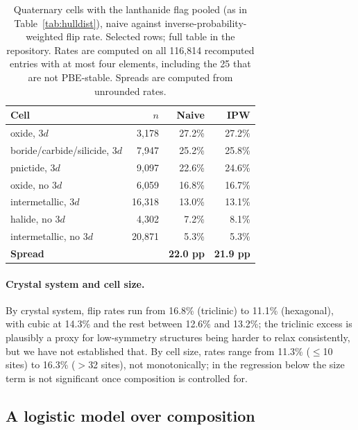 \documentclass[11pt]{article}
\begin{document}
\begin{table}[htbp]\centering
\caption{Quaternary cells with the lanthanide flag pooled (as in
Table~\ref{tab:hulldist}), naive against inverse-probability-weighted flip rate. Selected
rows; full table in the repository. Rates are computed on all 116{,}814 recomputed entries
with at most four elements, including the 25 that are not PBE-stable. Spreads are computed from unrounded rates.}
\label{tab:ipw}
\small\begin{tabular}{lrrr}
\toprule
Cell & $n$ & Naive & IPW \\
\midrule
oxide, 3$d$                    & \phantom{0}3{,}178 & 27.2\% & 27.2\% \\
boride/carbide/silicide, 3$d$  & \phantom{0}7{,}947 & 25.2\% & 25.8\% \\
pnictide, 3$d$                 & \phantom{0}9{,}097 & 22.6\% & 24.6\% \\
oxide, no 3$d$                 & \phantom{0}6{,}059 & 16.8\% & 16.7\% \\
intermetallic, 3$d$            & 16{,}318 & 13.0\% & 13.1\% \\
halide, no 3$d$                & \phantom{0}4{,}302 & \phantom{0}7.2\% & \phantom{0}8.1\% \\
intermetallic, no 3$d$         & 20{,}871 & \phantom{0}5.3\% & \phantom{0}5.3\% \\
\midrule
\textbf{Spread} & & \textbf{22.0 pp} & \textbf{21.9 pp} \\
\bottomrule
\end{tabular}
\end{table}

\paragraph{Crystal system and cell size.} By crystal system, flip rates run from 16.8\%
(triclinic) to 11.1\% (hexagonal), with cubic at 14.3\% and the rest between 12.6\% and
13.2\%; the triclinic excess is plausibly a proxy for low-symmetry structures being
harder to relax consistently, but we have not established that. By cell size, rates range
from 11.3\% ($\le$10 sites) to 16.3\% ($>$32 sites), not monotonically; in the regression below the size
term is not significant once composition is controlled for.

\subsection{A logistic model over composition}\label{sec:logit}
\end{document}

